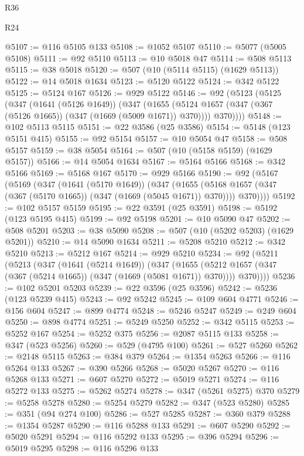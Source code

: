 \begin{lexlean}{R36}
\begin{lexlean}{R24}
\begin{coremodule}
{{{{{{{{{{{{{{{{{{{{{{{{{{{{{{{{{{{{{{{{{{{{{{{{{{{{{{{{{{{{{{{{{{{{{{{{{{{{{{{{{{{{{{{{{{{{{{{{{{{{{{{{{{{{{{{{{{{{{{{{{{{{{{{{{{{{{{{{{{{{{{{{{{{{{{{{{{{{{{{{{{{{{{{{{{{{{{{{{{{{{{{{{{{{{{{{{{{@5107 := @116 @5105 @133
@5108 := @1052 @5107
@5110 := @5077 (@5005 @5108)
@5111 := @92 @5110
@5113 := @10 @5018 @47
@5114 := @508 @5113
@5115 := @38 @5018
@5120 := @507 (@10 (@5114 @5115) (@1629 @5113))
@5122 := @14 @5018 @1634
@5123 := @5120 @5122
@5124 := @342 @5122
@5125 := @5124 @167
@5126 := @929 @5122
@5146 := @92
    (@5123
      (@5125
        (@347
          (@1641 (@5126 @1649))
          (@347
            (@1655 (@5124 @1657 (@347 (@367 (@5126 @1665)) (@347 (@1669 (@5009 @1671)) @370))))
            @370))))
@5148 := @102 @5113 @5115
@5151 := @22 @3586 (@25 @3586)
@5154 := @5148 (@123 @5151 @415)
@5155 := @92 @5154
@5157 := @10 @5054 @47
@5158 := @508 @5157
@5159 := @38 @5054
@5164 := @507 (@10 (@5158 @5159) (@1629 @5157))
@5166 := @14 @5054 @1634
@5167 := @5164 @5166
@5168 := @342 @5166
@5169 := @5168 @167
@5170 := @929 @5166
@5190 := @92
    (@5167
      (@5169
        (@347
          (@1641 (@5170 @1649))
          (@347
            (@1655 (@5168 @1657 (@347 (@367 (@5170 @1665)) (@347 (@1669 (@5045 @1671)) @370))))
            @370))))
@5192 := @102 @5157 @5159
@5195 := @22 @3591 (@25 @3591)
@5198 := @5192 (@123 @5195 @415)
@5199 := @92 @5198
@5201 := @10 @5090 @47
@5202 := @508 @5201
@5203 := @38 @5090
@5208 := @507 (@10 (@5202 @5203) (@1629 @5201))
@5210 := @14 @5090 @1634
@5211 := @5208 @5210
@5212 := @342 @5210
@5213 := @5212 @167
@5214 := @929 @5210
@5234 := @92
    (@5211
      (@5213
        (@347
          (@1641 (@5214 @1649))
          (@347
            (@1655 (@5212 @1657 (@347 (@367 (@5214 @1665)) (@347 (@1669 (@5081 @1671)) @370))))
            @370))))
@5236 := @102 @5201 @5203
@5239 := @22 @3596 (@25 @3596)
@5242 := @5236 (@123 @5239 @415)
@5243 := @92 @5242
@5245 := @109 @604 @4771
@5246 := @156 @604
@5247 := @899 @4774
@5248 := @5246 @5247
@5249 := @249 @604
@5250 := @898 @4774
@5251 := @5249 @5250
@5252 := @342 @5115
@5253 := @5252 @167
@5254 := @5252 @375
@5256 := @2087 @5115 @133
@5258 := @347 (@523 @5256)
@5260 := @529 (@4795 @100)
@5261 := @527 @5260
@5262 := @2148 @5115
@5263 := @384 @379
@5264 := @1354 @5263
@5266 := @116 @5264 @133
@5267 := @390 @5266
@5268 := @5020 @5267
@5270 := @116 @5268 @133
@5271 := @607 @5270
@5272 := @5019 @5271
@5274 := @116 @5272 @133
@5275 := @5262 @5274
@5278 := @347 (@5261 @5275) @370
@5279 := @5258 @5278
@5280 := @5254 @5279
@5282 := @347 (@523 @5280)
@5285 := @351 (@94 @274 @100)
@5286 := @527 @5285
@5287 := @360 @379
@5288 := @1354 @5287
@5290 := @116 @5288 @133
@5291 := @607 @5290
@5292 := @5020 @5291
@5294 := @116 @5292 @133
@5295 := @396 @5294
@5296 := @5019 @5295
@5298 := @116 @5296 @133
}}}}}}}}}}}}}}}}}}}}}}}}}}}}}}}}}}}}}}}}}}}}}}}}}}}}}}}}}}}}}}}}}}}}}}}}}}}}}}}}}}}}}}}}}}}}}}}}}}}}}}}}}}}}}}}}}}}}}}}}}}}}}}}}}}}}}}}}}}}}}}}}}}}}}}}}}}}}}}}}}}}}}}}}}}}}}}}}}}}}}}}}}}}}}}}}}}}
\end{coremodule}
\end{lexlean}
\end{lexlean}
